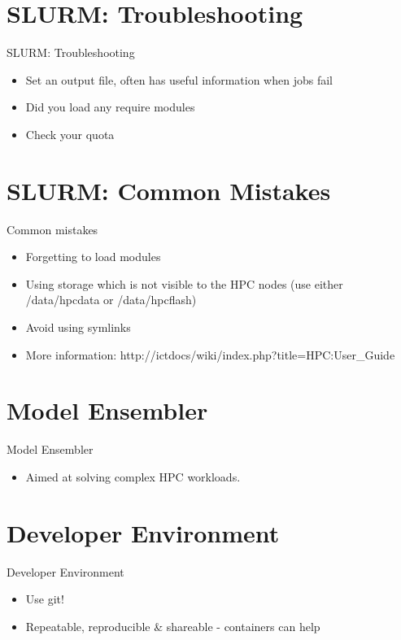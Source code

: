 {
\section{SLURM:  Troubleshooting}
%
\begin{frame}{SLURM: Troubleshooting}
\begin{itemize}
\item Set an output file, often has useful information when jobs fail
\item Did you load any require modules
\item Check your quota
\end{itemize}
\end{frame}
}

{
\section{SLURM: Common Mistakes}
%
\begin{frame}{Common mistakes}
\begin{itemize}
\item Forgetting to load modules
\item Using storage which is not visible to the HPC nodes (use either /data/hpcdata or /data/hpcflash)
\item Avoid using symlinks
\item More information: http://ictdocs/wiki/index.php?title=HPC:User_Guide
\end{itemize}
\end{frame}
}


{
\section{Model Ensembler}
%
\begin{frame}{Model Ensembler}
\begin{itemize}
\item Aimed at solving complex HPC workloads.
\end{itemize}
\end{frame}
}

{
\section{Developer Environment}
%
\begin{frame}{Developer Environment}
\begin{itemize}
\item Use git!
\item Repeatable, reproducible & shareable - containers can help
\end{itemize}
\end{frame}
}

